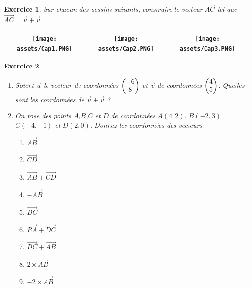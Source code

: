\documentclass[10pt,a4paper]{article}
\newtheorem{exo}{Exercice}
\begin{document}
\begin{exo}
    Sur chacun des dessins suivants, construire le vecteur $\overrightarrow{AC}$ tel que $\overrightarrow{AC}=\overrightarrow{u}+\overrightarrow{v}$
\end{exo}
\begin{tabular}{|c|c|c|}
    \hline
    \begin{minipage}{0.3\textwidth}
        \texttt{[image: assets/Cap1.PNG]} 
    \end{minipage} & 
    \begin{minipage}{0.3\textwidth}
        \texttt{[image: assets/Cap2.PNG]} 
    \end{minipage} & \begin{minipage}{0.3\textwidth}
        \texttt{[image: assets/Cap3.PNG]} 
    \end{minipage}\\
    \hline
\end{tabular}

\begin{exo}
    \begin{enumerate}
        \item Soient $\overrightarrow{u}$ le vecteur de coordonnées $ \begin{pmatrix} -6\\ 8 \end{pmatrix}$ et $\overrightarrow{v}$ de coordonnées $ \begin{pmatrix} 4\\ 5 \end{pmatrix}$. Quelles sont les coordonnées de $\overrightarrow{u}+\overrightarrow{v}$ ?
        \item On pose des points $A$,$B$,$C$ et $D$ de coordonnées $A(4,2)$, $B(-2,3)$, $C(-4,-1)$ et $D(2,0)$. Donnez les coordonnées des vecteurs 
        \begin{multicols}{3}
            \begin{enumerate}
                \item $\overrightarrow{AB}$
                \item $\overrightarrow{CD}$
                \item $\overrightarrow{AB}+\overrightarrow{CD}$
                \item $-\overrightarrow{AB}$
                \item $\overrightarrow{DC}$
                \item $\overrightarrow{BA}+\overrightarrow{DC}$
                \item $\overrightarrow{DC}+\overrightarrow{AB}$
                \item $2 \times \overrightarrow{AB}$
                \item $-2 \times \overrightarrow{AB}$
            \end{enumerate}
        \end{multicols}
    \end{enumerate}
\end{exo}
\end{document}

